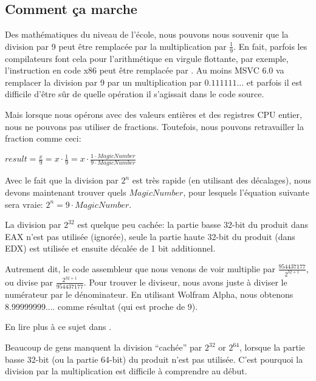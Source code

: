 ﻿\subsection{Comment ça marche}

Des mathématiques du niveau de l'école, nous pouvons nous souvenir que la division
par 9 peut être remplacée par la multiplication par $\frac{1}{9}$.
En fait, parfois les compilateurs font cela pour l'arithmétique en virgule flottante,
par exemple, l'instruction  en code x86 peut être remplacée par .
Au moins MSVC 6.0 va remplacer la division par 9 par un multiplication par $0.111111...$
et parfois il est difficile d'être sûr de quelle opération il s'agissait dans le
code source.

Mais lorsque nous opérons avec des valeurs entières et des registres CPU entier,
nous ne pouvons pas utiliser de fractions.
Toutefois, nous pouvons retravailler la fraction comme ceci:

\begin{center}
$result = \frac{x}{9} = x \cdot \frac{1}{9} = x \cdot \frac{1 \cdot MagicNumber}{9 \cdot MagicNumber}$
\end{center}

Avec le fait que la division par $2^n$ est très rapide (en utilisant des décalages),
nous devons maintenant trouver quels $MagicNumber$, pour lesquels l'équation suivante
sera vraie: $2^n = 9 \cdot MagicNumber$.

La division par $2^{32}$ est quelque peu cachée: la partie basse 32-bit du produit
dans EAX n'est pas utilisée (ignorée), seule la partie haute 32-bit du produit
(dans EDX) est utilisée et ensuite décalée de 1 bit additionnel.

Autrement dit, le code assembleur que nous venons de voir multiplie par {\Large $\frac{954437177}{2^{32+1}}$},
ou divise par {\Large $\frac{2^{32+1}}{954437177}$}.
Pour trouver le diviseur, nous avons juste à diviser le numérateur par le dénominateur.
En utilisant Wolfram Alpha, nous obtenons 8.99999999.... comme résultat (qui est
proche de 9).


En lire plus à ce sujet dans .

Beaucoup de gens manquent la division ``cachée'' par $2^{32}$ or $2^{64}$, lorsque
la partie basse 32-bit (ou la partie 64-bit) du produit n'est pas utilisée.
C'est pourquoi la division par la multiplication est difficile à comprendre au début.


